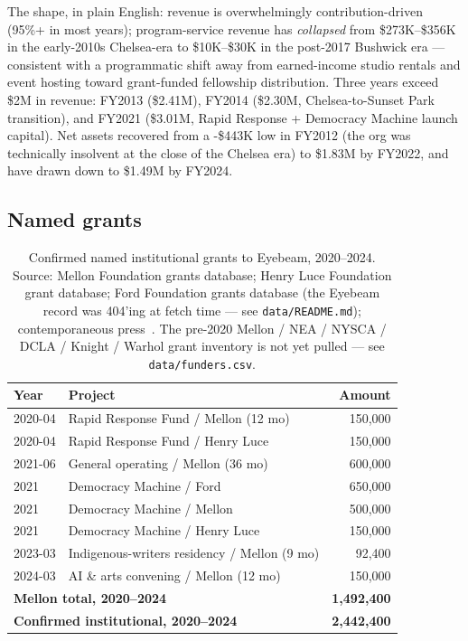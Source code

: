 \documentclass[10pt,letterpaper,twocolumn]{article}
\begin{document}
The shape, in plain English: revenue is overwhelmingly contribution-driven (95\%+ in most years); program-service revenue has \emph{collapsed} from \$273K--\$356K in the early-2010s Chelsea-era to \$10K--\$30K in the post-2017 Bushwick era --- consistent with a programmatic shift away from earned-income studio rentals and event hosting toward grant-funded fellowship distribution. Three years exceed \$2M in revenue: FY2013 (\$2.41M), FY2014 (\$2.30M, Chelsea-to-Sunset Park transition), and FY2021 (\$3.01M, Rapid Response + Democracy Machine launch capital). Net assets recovered from a -\$443K low in FY2012 (the org was technically insolvent at the close of the Chelsea era) to \$1.83M by FY2022, and have drawn down to \$1.49M by FY2024.

\subsection{Named grants}\label{sec:grants}

\begin{table}[h]
\footnotesize
\centering
\begin{tabularx}{\columnwidth}{l>{\raggedright\arraybackslash\hspace{0pt}}Xr}
\toprule
\textbf{Year} & \textbf{Project} & \textbf{Amount} \\
\midrule
2020-04 & Rapid Response Fund / Mellon (12 mo) & 150,000 \\
2020-04 & Rapid Response Fund / Henry Luce & 150,000 \\
2021-06 & General operating / Mellon (36 mo) & 600,000 \\
2021 & Democracy Machine / Ford & 650,000 \\
2021 & Democracy Machine / Mellon & 500,000 \\
2021 & Democracy Machine / Henry Luce & 150,000 \\
2023-03 & Indigenous-writers residency / Mellon (9 mo) & 92,400 \\
2024-03 & AI \& arts convening / Mellon (12 mo) & 150,000 \\
\midrule
\multicolumn{2}{l}{\textbf{Mellon total, 2020--2024}} & \textbf{1,492,400} \\
\multicolumn{2}{l}{\textbf{Confirmed institutional, 2020--2024}} & \textbf{2,442,400} \\
\bottomrule
\end{tabularx}
\caption{Confirmed named institutional grants to Eyebeam, 2020--2024. Source: Mellon Foundation grants database; Henry Luce Foundation grant database; Ford Foundation grants database (the Eyebeam record was 404'ing at fetch time --- see \texttt{data/README.md}); contemporaneous press~\citep{artnews2021restructure,artnet2021dm}. The pre-2020 Mellon / NEA / NYSCA / DCLA / Knight / Warhol grant inventory is not yet pulled --- see \texttt{data/funders.csv}.}
\label{tab:mellon}
\end{table}
\end{document}

